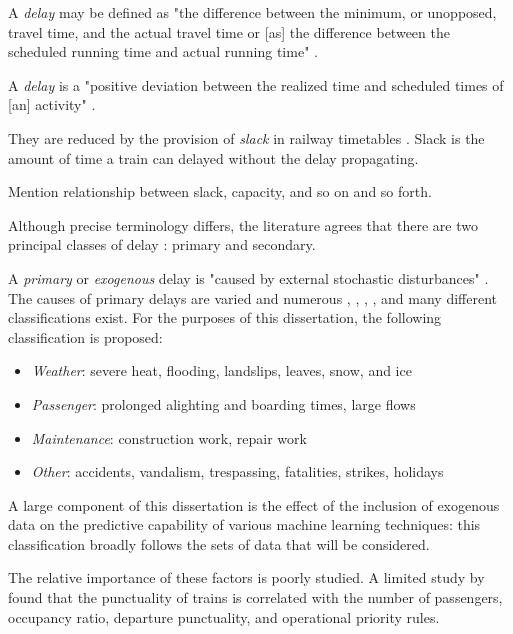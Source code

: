\documentclass{article}
\begin{document}
A \textit{delay} may be defined as "the difference between the minimum, or unopposed, travel time, and the actual travel time or [as] the difference between the scheduled running time and actual running time" \cite{dingler_koening_sam_christopher_2010}.

A \textit{delay} is a "positive deviation between the realized time and scheduled times of [an] activity" \cite{cerreto_nielsen_harrod_nielsen_2016}. 

They are reduced by the provision of  \textit{slack} in railway timetables \cite{cerreto_nielsen_harrod_nielsen_2016}. Slack is the amount of time a train can delayed without the delay propagating. 

Mention relationship between slack, capacity, and so on and so forth.

Although precise terminology differs, the literature agrees that there are two principal classes of delay \cite{olsson_haugland_2004}: primary and secondary.

A \textit{primary} or \textit{exogenous} delay is "caused by external stochastic disturbances" \cite{oneto_fumeo_clerico_canepa_papa_dambra_mazzino_anguita_2016}. The causes of primary delays are varied and numerous \cite{berger_et_al_2011}, \cite{milinkovic_markovic_veskovic_ivic_pavlovic_2013}, \cite{nr_delay_causes}, \cite{cerreto_nielsen_harrod_nielsen_2016}, and many different classifications exist. For the purposes of this dissertation, the following classification is proposed:

\begin{itemize}
	\item \textit{Weather}: severe heat, flooding, landslips, leaves, snow, and ice
	\item \textit{Passenger}: prolonged alighting and boarding times, large flows
	\item \textit{Maintenance}: construction work, repair work
	\item \textit{Other}: accidents, vandalism, trespassing, fatalities, strikes, holidays
\end{itemize}

A large component of this dissertation is the effect of the inclusion of exogenous data on the predictive capability of various machine learning techniques: this classification broadly follows the sets of data that will
be considered. 

The relative importance of these factors is poorly studied. A limited study by \cite{olsson_haugland_2004} found that the punctuality of trains is correlated with the number of passengers, occupancy ratio, departure punctuality, and operational priority rules.
\end{document}
